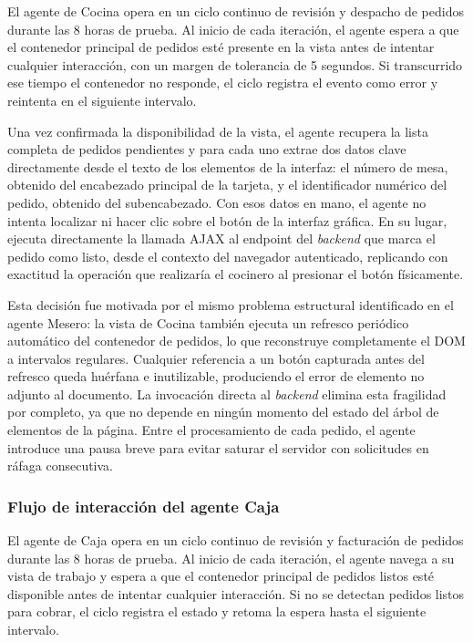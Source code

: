 El agente de Cocina opera en un ciclo continuo de revisión y despacho de pedidos durante las 8 horas de prueba. Al inicio de cada iteración, el agente espera a que el contenedor principal de pedidos esté presente en la vista antes de intentar cualquier interacción, con un margen de tolerancia de 5 segundos. Si transcurrido ese tiempo el contenedor no responde, el ciclo registra el evento como error y reintenta en el siguiente intervalo.

Una vez confirmada la disponibilidad de la vista, el agente recupera la lista completa de pedidos pendientes y para cada uno extrae dos datos clave directamente desde el texto de los elementos de la interfaz: el número de mesa, obtenido del encabezado principal de la tarjeta, y el identificador numérico del pedido, obtenido del subencabezado. Con esos datos en mano, el agente no intenta localizar ni hacer clic sobre el botón de la interfaz gráfica. En su lugar, ejecuta directamente la llamada AJAX al endpoint del \textit{backend} que marca el pedido como listo, desde el contexto del navegador autenticado, replicando con exactitud la operación que realizaría el cocinero al presionar el botón físicamente.

Esta decisión fue motivada por el mismo problema estructural identificado en el agente Mesero: la vista de Cocina también ejecuta un refresco periódico automático del contenedor de pedidos, lo que reconstruye completamente el DOM a intervalos regulares. Cualquier referencia a un botón capturada antes del refresco queda huérfana e inutilizable, produciendo el error de elemento no adjunto al documento. La invocación directa al \textit{backend} elimina esta fragilidad por completo, ya que no depende en ningún momento del estado del árbol de elementos de la página. Entre el procesamiento de cada pedido, el agente introduce una pausa breve para evitar saturar el servidor con solicitudes en ráfaga consecutiva.

\subsubsection*{Flujo de interacción del agente Caja}

El agente de Caja opera en un ciclo continuo de revisión y facturación de pedidos durante las 8 horas de prueba. Al inicio de cada iteración, el agente navega a su vista de trabajo y espera a que el contenedor principal de pedidos listos esté disponible antes de intentar cualquier interacción. Si no se detectan pedidos listos para cobrar, el ciclo registra el estado y retoma la espera hasta el siguiente intervalo.

